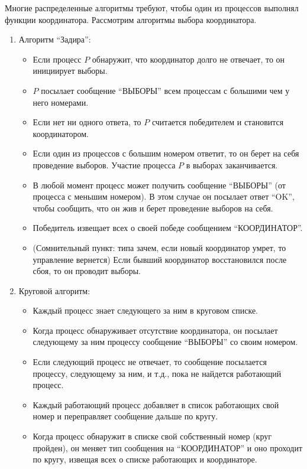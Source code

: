 Многие распределенные алгоритмы требуют, чтобы один из процессов выполнял функции координатора. Рассмотрим алгоритмы выбора координатора.
\begin{enumerate}
\item 
Алгоритм ``Задира'':
\begin{itemize}
    \setlength\itemsep{-0.4em}
    \item Если процесс $P$ обнаружит, что координатор долго не отвечает, то он инициирует выборы.
    \item $P$ посылает сообщение ``ВЫБОРЫ'' всем процессам с большими чем у него номерами.
    \item Если нет ни одного ответа, то $P$ считается победителем и становится координатором.
    \item Если один из процессов с большим номером ответит, то он берет на себя проведение выборов. Участие процесса $P$ в выборах заканчивается.
    \item В любой момент процесс может получить сообщение ``ВЫБОРЫ'' (от процесса с меньшим номером). В этом случае он посылает ответ ``OK'', чтобы сообщить, что он жив и берет проведение выборов на себя.
    \item Победитель извещает всех о своей победе сообщением ``КООРДИНАТОР''.
    \item (Сомнительный пункт: типа зачем, если новый координатор умрет, то управление вернется) Если бывший координатор восстановился после сбоя, то он проводит выборы.
\end{itemize}
 
\item 
Круговой алгоритм:
\begin{itemize}
\item
Каждый процесс знает следующего за ним в круговом списке.
\item
Когда процесс обнаруживает отсутствие координатора, он посылает следующему за ним процессу сообщение ``ВЫБОРЫ'' со своим номером.
\item
Если следующий процесс не отвечает, то сообщение посылается процессу, следующему за ним, и т.д., пока не найдется работающий процесс.
\item
Каждый работающий процесс добавляет в список работающих свой номер и переправляет сообщение дальше по кругу. 
\item
Когда процесс обнаружит в списке свой собственный номер (круг пройден), он меняет тип сообщения на ``КООРДИНАТОР'' и оно проходит по кругу, извещая всех о списке работающих и координаторе.
\end{itemize}
\end{enumerate}


